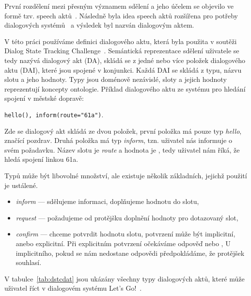 První rozdělení mezi přesným významem sdělení a jeho účelem se objevilo ve formě tzv. speech aktů~\cite{austin1975things}.
Následně byla idea speech aktů rozšířena pro potřeby dialogových systémů~\cite{traum1999speech} a výsledek byl nazván dialogovým aktem.

V této práci používáme definici dialogového aktu, která byla použita v soutěži Dialog State Tracking Challenge~\cite{williamsdialog}.
Semántická reprezentace sdělení uživatele se tedy nazývá dialogový akt (DA), skládá se z jedné nebo více položek dialogového aktu (DAI), které jsou spojené v konjunkci.
Každá DAI se skládá z typu, názvu slotu a jeho hodnoty. Typy jsou doménově nezávislé, sloty a jejich hodnoty reprezentují koncepty ontologie.
Příklad dialogového aktu ze systému pro hledání spojení v městské dopravě:

\begin{center}
{\tt hello(), inform(route="61a")}.
\end{center}

Zde se dialogový akt skládá ze dvou položek, první položka má pouze typ {\em hello}, značící pozdrav.
Druhá položka má typ {\em inform}, tzn. uživatel nás informuje o svém požadavku.
Název slotu je {\em route} a hodnota je , tedy uživatel nám říká, že hledá spojení linkou 61a.

Typů může být libovolné množství, ale existuje několik základních, jejichž použití je ustálené.
\begin{itemize}
\item {\em inform} --- sdělujeme informaci, doplňujeme hodnotu do slotu,
\item {\em request} --- požadujeme od protějšku doplnění hodnoty pro dotazovaný slot,
\item {\em confirm} --- chceme potvrdit hodnotu slotu, potvrzení může být implicitní, anebo explicitní.
	Při explicitním potvrzení očekáváme odpověď  nebo ,
	U implicitního, pokud se nám nedostane odpovědi předpokládáme, že protějšek souhlasí.
\end{itemize}

V tabulce~\ref{tab:dstcdat} jsou ukázány všechny typy dialogových aktů, které může uživatel říct v dialogovém systému Let's Go!~\cite{williamsdialog}.


